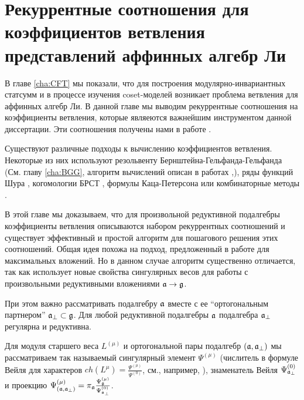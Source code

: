 
\chapter{Рекуррентные соотношения для коэффициентов ветвления представлений аффинных алгебр Ли}
\label{cha:affine-lie-algebras}

В главе \ref{cha:CFT} мы показали, что для построения модулярно-инвариантных статсумм и в процессе изучения coset-моделей возникает проблема ветвления для аффинных алгебр Ли.  В данной главе мы выводим рекуррентные соотношения на коэффициенты ветвления, которые являеются важнейшим инструментом данной диссертации. Эти соотношения получены нами в работе \cite{2010arXiv1007.0318L}.

Существуют различные подходы к вычислению коэффициентов ветвления. Некоторые из них используют резольвенту Бернштейна-Гельфанда-Гельфанда \cite{bernstein1975differential} (См. главу \ref{cha:BGG}, алгоритм вычислений описан в работах \cite{kac1990idl},\cite{wakimoto2001idl}), ряды функций Шура \cite{fauser2006new}, когомологии БРСТ  \cite{Hwang:1994yr}, формулы Каца-Петерсона  \cite{kac1990idl,quella2002branching} или комбинаторные методы \cite{feigin707principal}.

В этой главе мы доказываем, что для произвольной редуктивной подалгебры коэффициенты ветвления описываются набором рекуррентных соотношений и существует эффективный и простой алгоритм для пошагового решения этих соотношений. Общая идея похожа на подход, предложенный в работе  \cite{ilyin812pbc} для максимальных вложений. Но в данном случае алгоритм существенно отличается, так как использует новые свойства сингулярных весов для работы с произвольными редуктивными вложениями $\mathfrak{a} \rightarrow \mathfrak{g}$.

При этом важно рассматривать подалгебру  $\mathfrak{a}$ вместе с ее ``ортогональным партнером'' $\mathfrak{a}_{\perp}\subset \mathfrak{g}$. 
Для любой редуктивной подалгебры $\mathfrak{a}$ подалгебра $\mathfrak{a}_{\perp}$ регулярна и редуктивна. 

Для модуля старшего веса  $L^{\left( \mu \right)}$ и ортогональной пары подалгебр $\left(  \mathfrak{a}, \mathfrak{a}_{\perp} \right)$ мы рассматриваем так называемый сингулярный элемент  $\Psi^{\left( \mu \right)}$ (числитель в формуле Вейля для характеров
$ch\left( L^{\mu }\right) =\frac{\Psi ^{\left( \mu \right) }}{\Psi ^{\left( 0\right) }}$,
см., например, \cite{humphreys1997introduction}), 
знаменатель Вейля $\Psi ^{\left( 0\right) }_{\mathfrak{a}_{\perp}}$ и проекцию
$\Psi ^{\left( \mu \right) }_{\left(  \mathfrak{a}, \mathfrak{a}_{\perp} \right)}
=\pi_{\mathfrak{a}}\frac{\Psi ^{\left( \mu \right) }_{\mathfrak{g}}}{\Psi ^{\left( 0\right) }_{\mathfrak{a}_{\perp}}}$.

